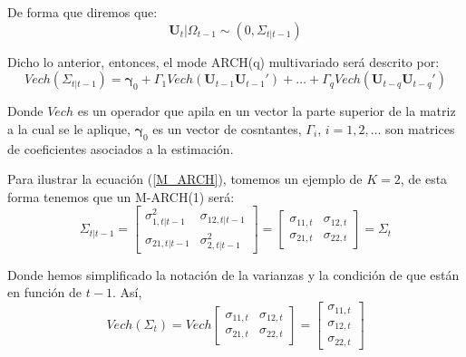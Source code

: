 \documentclass[
  a4paper,
]{article}
\begin{document}
De forma que diremos que: \begin{equation*}
    \mathbf{U}_t | \Omega_{t-1} \sim (0, \Sigma_{t | t-1})
\end{equation*}

Dicho lo anterior, entonces, el mode ARCH(q) multivariado será descrito
por: \[
    Vech(\Sigma_{t | t-1}) = \boldsymbol{\gamma}_0 + \Gamma_1 Vech(\mathbf{U}_{t-1} \mathbf{U}_{t-1}') + \ldots + \Gamma_q Vech(\mathbf{U}_{t-q} \mathbf{U}_{t-q}')
    \label{M_ARCH}
\]

Donde \(Vech\) es un operador que apila en un vector la parte superior
de la matriz a la cual se le aplique, \(\boldsymbol{\gamma}_0\) es un
vector de cosntantes, \(\Gamma_i\), \(i = 1, 2, \ldots\) son matrices de
coeficientes asociados a la estimación.

Para ilustrar la ecuación (\ref{M_ARCH}), tomemos un ejemplo de
\(K = 2\), de esta forma tenemos que un M-ARCH(1) será:
\begin{equation*}
    \Sigma_{t | t-1} = 
    \begin{bmatrix}
    \sigma^2_{1, t | t-1} & \sigma_{12, t | t-1} \\ \sigma_{21, t | t-1} & \sigma^2_{2, t | t-1}
    \end{bmatrix} = 
    \begin{bmatrix}
    \sigma_{11, t} & \sigma_{12, t} \\ \sigma_{21, t} & \sigma_{22, t}
    \end{bmatrix} =
    \Sigma_{t}
\end{equation*}

Donde hemos simplificado la notación de la varianzas y la condición de
que están en función de \(t-1\). Así, \begin{equation*}
    Vech(\Sigma_{t}) = 
    Vech \begin{bmatrix}
    \sigma_{11, t} & \sigma_{12, t} \\ \sigma_{21, t} & \sigma_{22, t}
    \end{bmatrix} =
    \begin{bmatrix}
    \sigma_{11, t} \\ \sigma_{12, t} \\ \sigma_{22, t}
    \end{bmatrix}
\end{equation*}
\end{document}
